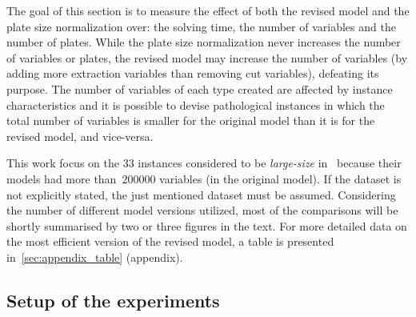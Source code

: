 \documentclass[runningheads]{llncs}
\begin{document}
The goal of this section is to measure the effect of both the revised model and the plate size normalization over: the solving time, the number of variables and the number of plates.
While the plate size normalization never increases the number of variables or plates, the revised model may increase the number of variables (by adding more extraction variables than removing cut variables), defeating its purpose.
The number of variables of each type created are affected by instance characteristics and it is possible to devise pathological instances in which the total number of variables is smaller for the original model than it is for the revised model, and vice-versa.

This work focus on the 33 instances considered to be \emph{large-size} in~\cite{furini:2016} because their models had more than~\(200000\) variables (in the original model).
If the dataset is not explicitly stated, the just mentioned dataset must be assumed.
Considering the number of different model versions utilized, most of the comparisons will be shortly summarised by two or three figures in the text.
For more detailed data on the most efficient version of the revised model, a table is presented in~\autoref{sec:appendix_table} (appendix).

\subsection{Setup of the experiments}
\label{sec:experiment_setup}
\end{document}
